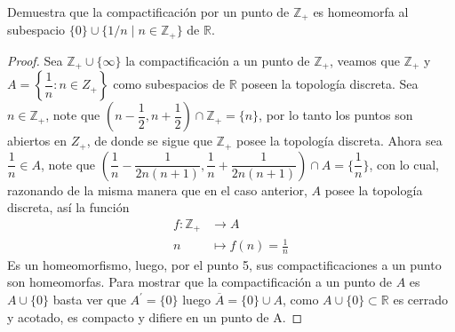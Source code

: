
 \item Demuestra que la compactificación por un punto de $\mathbb{Z}_{+}$ es homeomorfa al subespacio $\{0\} \cup \{1 / n \mid n \in \mathbb{Z}_{+}\}$ de $\mathbb{R}$.

 \begin{proof}
Sea $\mathbb{Z}_{+}\cup \{\infty\}$ la compactificación a un punto de $\mathbb{Z}_{+}$, veamos que $\mathbb{Z}_{+}$ y $A=\left\{\dfrac{1}{n}: n \in Z_{+}\right\}$ como subespacios de $\mathbb{R}$ poseen la topología discreta. Sea $n \in \mathbb{Z}_{+}$, note que $\left(n-\dfrac{1}{2}, n + \dfrac{1}{2}\right) \cap \mathbb{Z}_{+} = \{n\}$, por lo tanto los puntos son abiertos en ${Z}_{+}$, de donde se sigue que $\mathbb{Z}_{+}$ posee la topología discreta. Ahora sea $\dfrac{1}{n} \in A$, note que $\left(\dfrac{1}{n}-\dfrac{1}{2n(n+1)},\dfrac{1}{n}+\dfrac{1}{2n(n+1)}\right)\cap A = \{\dfrac{1}{n}\}$, con lo cual, razonando de la misma manera que en el caso anterior, $A$ posee la topología discreta, así la función
\begin{align*}
    f : \mathbb{Z}_{+}&\longrightarrow A \\
    n &\longmapsto f(n) = \frac{1}{n}
\end{align*} 
Es un homeomorfismo, luego, por el punto 5, sus compactificaciones a un punto son homeomorfas. Para mostrar que la compactificación a un punto de $A$ es $A \cup \{0\}$  basta ver que $A^{\prime}=\{0\}$ luego $\overline{A}=\{0\} \cup A$, como $A \cup \{0\} \subset \mathbb{R}$ es cerrado y acotado, es compacto y difiere en un punto de A.  
 \end{proof}